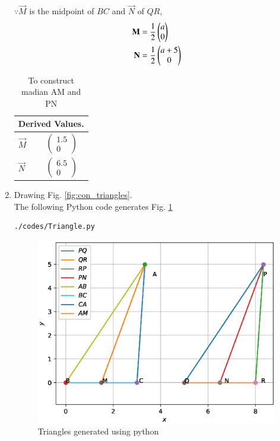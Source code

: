 \begin{enumerate}[label=\thesection.\arabic*.,ref=\thesection.\theenumi]
$\because \vec{M}$ is the midpoint of $BC$ and $\vec{N}$ of $QR$,
\begin{align}
\mathbf{M} &= \frac{1}{2}\begin{pmatrix}a\\0\end{pmatrix}
\\
\mathbf{N} &= \frac{1}{2}\begin{pmatrix}a+5\\0\end{pmatrix}
\end{align}
 
\begin{table}[ht!]
\centering
\begin{tabular}{ |p{3cm}|p{3cm}|  }
\hline
 \multicolumn{2}{|c|}{Derived Values.} \\
\hline
$\vec{M}$ & $$\begin{pmatrix}1.5\\0\end{pmatrix}$$\\						
\hline
$\vec{N}$ & $$\begin{pmatrix}6.5\\0\end{pmatrix} $$\\
\hline
\end{tabular}
\caption{To construct madian AM and PN}
\label{table:table2}
\end{table}
%
\item Drawing  Fig. \ref{fig:con_triangles}.	
\\
 The  following Python code generates Fig. \ref{fig:tri_sss_py}
 \\
%
\begin{lstlisting}
./codes/Triangle.py
\end{lstlisting}
\begin{figure}[!ht]
\centering
\includegraphics[width=\columnwidth]{./figs/Triangle.eps}
\caption{Triangles generated using python}
\label{fig:tri_sss_py}
\end{figure}


\end{enumerate}
